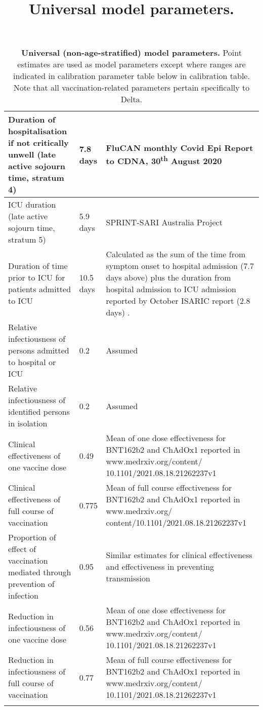 \begin{longtable}[ht]{| >{\raggedright}p{4cm} | >{\raggedright}p{3cm} | p{6.8cm} |}
    \hline
    Duration of hospitalisation if not critically unwell (late active sojourn time, stratum 4) &
    7.8 days &
    FluCAN monthly Covid Epi Report to CDNA, 30\textsuperscript{th} August 2020 \\
    \hline
    ICU duration (late active sojourn time, stratum 5) & 5.9 days &
    SPRINT-SARI Australia Project \\
    \hline
    Duration of time prior to ICU for patients admitted to ICU & 
    10.5 days & 
    Calculated as the sum of the time from symptom onset to hospital admission (7.7 days above) plus the duration from hospital admission to ICU admission reported by October ISARIC report (2.8 days) \cite{RN22}. \\
    \hline
    Relative infectiousness of persons admitted to hospital or ICU & 0.2 & Assumed \\
    \hline
    Relative infectiousness of identified persons in isolation & 0.2 & Assumed \\
    \hline
    Clinical effectiveness of one vaccine dose & 0.49 & Mean of one dose effectiveness for BNT162b2 and ChAdOx1 reported in www.medrxiv.org/content/ 10.1101/2021.08.18.21262237v1 \\
    \hline
    Clinical effectiveness of full course of vaccination & 0.775 & Mean of full course effectiveness for BNT162b2 and ChAdOx1 reported in www.medrxiv.org/ content/10.1101/2021.08.18.21262237v1 \\
    \hline
    Proportion of effect of vaccination mediated through prevention of infection & 0.95 & Similar estimates for clinical effectiveness and effectiveness in preventing transmission \\
    \hline
    Reduction in infectiousness of one vaccine dose & 0.56 & Mean of one dose effectiveness for BNT162b2 and ChAdOx1 reported in www.medrxiv.org/content/ 10.1101/2021.08.18.21262237v1 \\
    \hline
    Reduction in infectiousness of full course of vaccination & 0.77 & Mean of full course effectiveness for BNT162b2 and ChAdOx1 reported in www.medrxiv.org/content/ 10.1101/2021.08.18.21262237v1 \\
    \hline    
	\caption{\textbf{Universal (non-age-stratified) model parameters.} Point estimates are used as model parameters except where ranges are indicated in calibration parameter table below in calibration table. Note that all vaccination-related parameters pertain specifically to Delta.}
	\title{Universal model parameters.}
	\label{tab:params}
\end{longtable}
